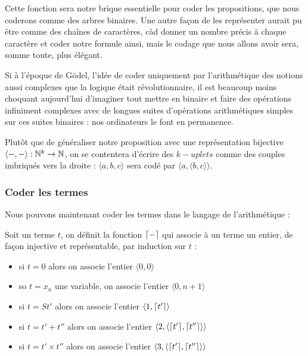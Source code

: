 Cette fonction sera notre brique essentielle pour coder les propositions, que nous coderons comme des arbres binaires. Une autre façon de les représenter aurait pu être comme des chaînes de caractères, càd donner un nombre précis à chaque caractère et coder notre formule ainsi, mais le codage que nous allons avoir sera, somme toute, plus élégant.

\begin{rmk}
    Si à l'époque de Gödel, l'idée de coder uniquement par l'arithmétique des notions aussi complexes que la logique était révolutionnaire, il est beaucoup moins choquant aujourd'hui d'imaginer tout mettre en binaire et faire des opérations infiniment complexes avec de longues suites d'opérations arithmétiques simples sur ces suites binaires : nos ordinateurs le font en permanence.
\end{rmk}

Plutôt que de généraliser notre proposition avec une représentation bijective $\langle -,-\rangle : \mathbb{N}^k\to\mathbb{N}$, on se contentera d'écrire des $k-uplets$ comme des couples imbriqués vers la droite : $\langle a,b,c\rangle$ sera codé par $\langle a,\langle b,c\rangle\rangle$.

\subsubsection{Coder les termes}

Nous pouvons maintenant coder les termes dans le langage de l'arithmétique :

\begin{defi}
    Soit un terme $t$, on définit la fonction $\lceil - \rceil$ qui associe à un terme un entier, de façon injective et représentable, par induction sur $t$ :
    \begin{itemize}[label=$\bullet$]
        \item si $t = 0$ alors on associe l'entier $\langle 0,0\rangle$
        \item so $t = x_n$ une variable, on associe l'entier $\langle 0,n+1\rangle$
        \item si $t = S t'$ alors on associe l'entier $\langle 1,\lceil t' \rceil\rangle$
        \item si $t = t' + t''$ alors on associe l'entier $\langle 2, \langle \lceil t' \rceil,\lceil t'' \rceil\rangle\rangle$
        \item si $t = t' \times t''$ alors on associe l'entier $\langle 3, \langle \lceil t' \rceil,\lceil t'' \rceil\rangle\rangle$
    \end{itemize}
\end{defi}

